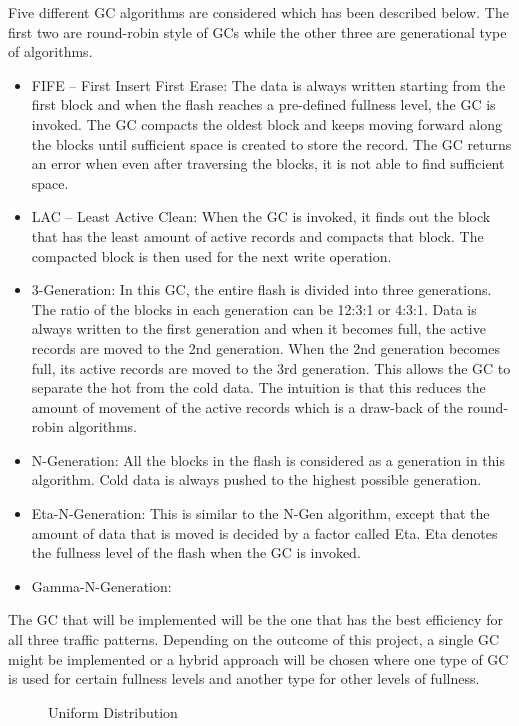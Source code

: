 Five different GC algorithms are considered which has been described below. The first two are round-robin style of GCs while the other three are generational type of algorithms.
\begin{itemize}
\item FIFE – First Insert First Erase:
The data is always written starting from the first block and when the flash reaches a pre-defined fullness level, the GC is invoked. The GC compacts the oldest block and keeps moving forward along the blocks until sufficient space is created to store the record. The GC returns an error when even after traversing the blocks, it is not able to find sufficient space. 
\item LAC – Least Active Clean:
When the GC is invoked, it finds out the block that has the least amount of active records and compacts that block. The compacted block is then used for the next write operation.
\item 3-Generation:
In this GC, the entire flash is divided into three generations. The ratio of the blocks in each generation can be 12:3:1 or 4:3:1. Data is always written to the first generation and when it becomes full, the active records are moved to the 2nd generation. When the 2nd generation becomes full, its active records are moved to the 3rd generation. This allows the GC to separate the hot from the cold data. The intuition is that this reduces the amount of movement of the active records which is a draw-back of the round-robin algorithms.
\item N-Generation:
All the blocks in the flash is considered as a generation in this algorithm. Cold data is always pushed to the highest possible generation.
\item Eta-N-Generation:
This is similar to the N-Gen algorithm, except that the amount of data that is moved is decided by a factor called Eta. Eta denotes the fullness level of the flash when the GC is invoked.
\item Gamma-N-Generation:
\end{itemize}	


The GC that will be implemented will be the one that has the best efficiency for all three traffic patterns. Depending on the outcome of this project, a single GC might be implemented or a hybrid approach will be chosen where one type of GC is used for certain fullness levels and another type for other levels of fullness.

\begin{figure}
\centering
	\caption{Uniform Distribution} 
	\label{fig:EcUND} 
\end{figure} 

